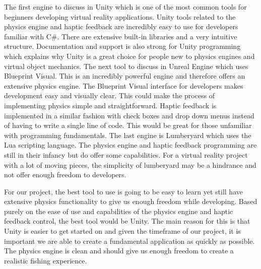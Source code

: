 \documentclass[10pt,journal,compsoc,onecolumn, draftclsnofoot]{IEEEtran}
\begin{document}
The first engine to discuss in Unity which is one of the most common tools for beginners developing virtual reality applications.
Unity tools related to the physics engine and haptic feedback are incredibly easy to use for developers familiar with C\#.
There are extensive built-in libraries and a very intuitive structure\cite{unity_getting_started}.
Documentation and support is also strong for Unity programming which explains why Unity is a great choice for people new to physics engines and virtual object mechanics.
The next tool to discuss in Unreal Engine which uses Blueprint Visual.
This is an incredibly powerful engine and therefore offers an extensive physics engine\cite{unreal_editor_manual}.
The Blueprint Visual interface for developers makes development easy and visually clear.
This could make the process of implementing physics simple and straightforward.
Haptic feedback is implemented in a similar fashion with check boxes and drop down menus instead of having to write a single line of code.
This would be great for those unfamiliar with programming fundamentals.
The last engine is Lumberyard which uses the Lua scripting language.
The physics engine and haptic feedback programming are still in their infancy but do offer some capabilities\cite{lumberyard_object_system}.
For a virtual reality project with a lot of moving pieces, the simplicity of lumberyard may be a hindrance and not offer enough freedom to developers.

For our project, the best tool to use is going to be easy to learn yet still have extensive physics functionality to give us enough freedom while developing.
Based purely on the ease of use and capabilities of the physics engine and haptic feedback control, the best tool would be Unity.
The main reason for this is that Unity is easier to get started on and given the timeframe of our project, it is important we are able to create a fundamental application as quickly as possible.
The physics engine is clean and should give us enough freedom to create a realistic fishing experience.
\vspace{2mm}
\end{document}
